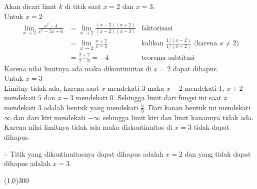 \begin{enumerate}[leftmargin=*, label={\arabic*}.]
\begin{enumerate}[label={\alph*}.]
    Akan dicari limit $k$ di titik saat $x=2$ dan $x=3$.\\
    Untuk $x=2$
    \begin{align*}
        \lim_{x \to 2} \frac{x^{2}-4}{x^{2}-5x+6}
        &= \lim_{x \to 2} \frac{(x-2)(x+2)}{(x-2)(x-3)}
        &\text{faktorisasi}\\
        &= \lim_{x \to 2} \frac{x+2}{x-3}
        &\text{kalikan $\frac{1/(x-2)}{1/(x-2)}$ (karena $x \neq 2$)}\\
        &= \frac{2+2}{2-3} = -4
        &\text{teorema subtitusi}
    \end{align*}
    Karena nilai limitnya ada maka dikontinuitas di $x=2$ dapat dihapus.\\
    Untuk $x=3$\\
    Limitny tidak ada, karena saat $x$ mendekati $3$ maka $x-2$ mendekati $1$, 
    $x+2$ mendekati $5$ dan $x-3$ mendekati 0. Sehingga limit dari fungsi ini 
    saat $x$ mendekati $3$ adalah bentuk yang mendekati $\frac{5}{0}$. Dari kanan 
    bentuk ini mendekati $\infty$ dan dari kiri mendekati $-\infty$ sehingga limit 
    kiri dan limit kanannya tidak ada.\\
    Karena nilai limitnya tidak ada maka diskontinuitas di $x=3$ tidak dapat dihapus.

    $\therefore$ Titik yang dikontinuitasnya dapat dihapus adalah $x=2$ dan yang tidak 
    dapat dihapus adalah $x=3$.
 
    \end{enumerate}
\end{enumerate}

\begin{center}\line(1,0){300}\end{center}
